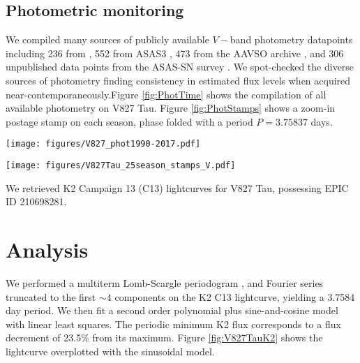 \documentclass[twocolumn]{emulateapj}%
\begin{document}
\subsection{Photometric monitoring}

We compiled many sources of publicly available $V-$band photometry datapoints including 236 from \citep{grankin08}, 552 from ASAS3 \citep{pojmanski04}, 473 from the AAVSO archive \citep{kafka16}, and 306 unpublished data points from the ASAS-SN survey \citep{shappee14}.  We spot-checked the diverse sources of photometry finding consistency in estimated flux levels when acquired near-contemporaneously.Figure \ref{fig:PhotTime} shows the compilation of all available photometry on V827 Tau.  Figure \ref{fig:PhotStamps} shows a zoom-in postage stamp on each season, phase folded with a period $P=3.75837$ days.

\begin{figure*}
 \centering
 \texttt{[image: figures/V827\_phot1990-2017.pdf]}
 \caption{Compilation of archival and new flux measurements in $V-$band for V827 Tau, normalized to the global maximum flux value, which occurred in 1990.  The y-axis equals the minimum starspot area, when flux deficits are interpreted with the simplest possible analytic starspot model.}
 \label{fig:PhotTime}
\end{figure*}

\begin{figure*}
 \centering
 \texttt{[image: figures/V827Tau\_25season\_stamps\_V.pdf]}
 \caption{Phase-folded $V-$band flux measurements of V827 Tau grouped into 25 observing seasons, and normalized to the global maximum in 1990.  The y-axis equals the minimum starspot area, when flux deficits are interpreted with the simplest possible analytic starspot model.}
 \label{fig:PhotStamps}
\end{figure*}


We retrieved K2 Campaign 13 (C13) \cite{2014PASP..126..398H} lightcurves for V827 Tau, possessing EPIC ID 210698281.


\section{Analysis}\label{sec:Analysis}
 We performed a multiterm Lomb-Scargle periodogram \citep{ivezic14}, and Fourier series truncated to the first $\sim 4$ components \citep{vanderplas15a} on the K2 C13 lightcurve, yielding a 3.7584 day period.  We then fit a second order polynomial plus sine-and-cosine model with linear least squares.  The periodic minimum K2 flux corresponds to a flux decrement of 23.5\% from its maximum.  Figure \ref{fig:V827TauK2} shows the lightcurve overplotted with the sinusoidal model.
\end{document}
